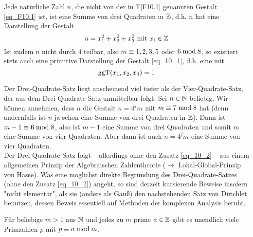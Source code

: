 \begin{satz} \label{3quadsatz}
	Jede natürliche Zahl $n$, die nicht von der in F\ref{F10.1} genannten Gestalt \eqref{eq_F10.1} ist, ist eine Summe von drei Quadraten in $\mathbb{Z}$, d.h. $n$ hat eine Darstellung der Gestalt
	\begin{equation}
		n = x_1^2 + x_2^2 + x_3^2 \text{ mit } x_i \in \mathbb{Z} \label{eq_10_1}
	\end{equation}
	Ist zudem $n$ nicht durch $4$ teilbar, also $m \equiv 1,2,3,5$ oder $6 \bmod 8$, so existiert stets auch eine primitive Darstellung der Gestalt \eqref{eq_10_1}, d.h. eine mit
	\begin{equation}
		\operatorname{ggT}(x_1,x_2,x_3) = 1 \label{eq_10_2}
	\end{equation}
\end{satz}

Der Drei-Quadrate-Satz liegt anscheinend viel tiefer als der Vier-Quadrate-Satz, der aus dem Drei-Quadrate-Satz unmittelbar folgt: Sei $n \in \mathbb{N}$ beliebig. Wir können annehmen, dass $n$ die Gestalt $n = 4^jm$ mit $m \equiv 7 \bmod 8$ hat (denn andernfalls ist $n$ ja schon eine Summe von drei Quadraten in $\mathbb{Z}$). Dann ist $m - 1 \equiv 6 \bmod 8$, also ist $m-1$ eine Summe von drei Quadraten und somit $m$ eine Summe von vier Quadraten. Aber dann ist auch $n = 4^jm$ eine Summe von vier Quadraten. \\
Der Drei-Quadrate-Satz folgt -- allerdings ohne den Zusatz \eqref{eq_10_2} -- aus einem allgemeinen Prinzip der Algebraischen Zahlentheorie ($\rightarrow$ Lokal-Global-Prinzip von Hasse). Was eine möglichst direkte Begründung des Drei-Quadrate-Satzes (ohne den Zusatz \eqref{eq_10_2}) angeht, so sind derzeit kursierende Beweise insofern "nicht elementar", als sie (anders als Gauß) den nachstehenden Satz von Dirichlet benutzen, dessen Beweis essentiell auf Methoden der komplexen Analysis beruht.

\begin{satz} \label{satz_dirichlet}
	Für beliebige $m > 1$ aus $\mathbb{N}$ und jedes zu $m$ prime $a \in \mathbb{Z}$ gibt es unendlich viele Primzahlen $p$ mit $p \equiv a \bmod m$.
\end{satz}

